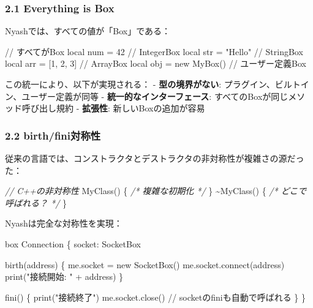\documentclass[
]{article}
\newenvironment{Shaded}{}{}
\newcommand{\CommentTok}[1]{\textcolor[rgb]{0.38,0.63,0.69}{\textit{#1}}}
\newcommand{\NormalTok}[1]{#1}
\newcommand{\OperatorTok}[1]{\textcolor[rgb]{0.40,0.40,0.40}{#1}}
\begin{document}
\hypertarget{everything-is-box}{%
\subsubsection{2.1 Everything is Box}\label{everything-is-box}}

Nyashでは、すべての値が「Box」である：

\begin{Shaded}
\begin{Highlighting}[]
\NormalTok{// すべてがBox}
\NormalTok{local num = 42              // IntegerBox}
\NormalTok{local str = "Hello"        // StringBox  }
\NormalTok{local arr = [1, 2, 3]      // ArrayBox}
\NormalTok{local obj = new MyBox()    // ユーザー定義Box}
\end{Highlighting}
\end{Shaded}

この統一により、以下が実現される： - \textbf{型の境界がない}:
プラグイン、ビルトイン、ユーザー定義が同等 -
\textbf{統一的なインターフェース}: すべてのBoxが同じメソッド呼び出し規約
- \textbf{拡張性}: 新しいBoxの追加が容易

\hypertarget{birthfiniux5bfeux79f0ux6027}{%
\subsubsection{2.2 birth/fini対称性}\label{birthfiniux5bfeux79f0ux6027}}

従来の言語では、コンストラクタとデストラクタの非対称性が複雑さの源だった：

\begin{Shaded}
\begin{Highlighting}[]
\CommentTok{// C++の非対称性}
\NormalTok{MyClass}\OperatorTok{()} \OperatorTok{\{} \CommentTok{/* 複雑な初期化 */} \OperatorTok{\}}
\OperatorTok{\textasciitilde{}}\NormalTok{MyClass}\OperatorTok{()} \OperatorTok{\{} \CommentTok{/* どこで呼ばれる？ */} \OperatorTok{\}}
\end{Highlighting}
\end{Shaded}

Nyashは完全な対称性を実現：

\begin{Shaded}
\begin{Highlighting}[]
\NormalTok{box Connection \{}
\NormalTok{    socket: SocketBox}
    
\NormalTok{    birth(address) \{}
\NormalTok{        me.socket = new SocketBox()}
\NormalTok{        me.socket.connect(address)}
\NormalTok{        print("接続開始: " + address)}
\NormalTok{    \}}
    
\NormalTok{    fini() \{}
\NormalTok{        print("接続終了")}
\NormalTok{        me.socket.close()}
\NormalTok{        // socketのfiniも自動で呼ばれる}
\NormalTok{    \}}
\NormalTok{\}}
\end{Highlighting}
\end{Shaded}
\end{document}
